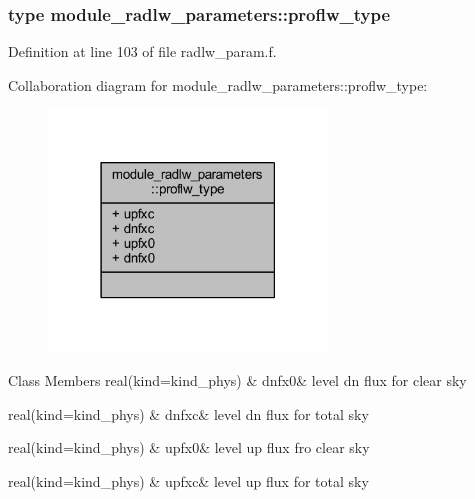 \subsubsection{type module\+\_\+radlw\+\_\+parameters\+:\+:proflw\+\_\+type}


Definition at line 103 of file radlw\+\_\+param.\+f.



Collaboration diagram for module\+\_\+radlw\+\_\+parameters\+:\+:proflw\+\_\+type\+:\nopagebreak
\begin{figure}[H]
\begin{center}
\leavevmode
\includegraphics[width=210pt]{structmodule__radlw__parameters_1_1proflw__type__coll__graph}
\end{center}
\end{figure}
\begin{DoxyFields}{Class Members}
real(kind=kind\+\_\+phys)\hypertarget{group__module__radlw__main_ga4804a215b761165846e87428b3f3c12c}{}\label{group__module__radlw__main_ga4804a215b761165846e87428b3f3c12c}
&
dnfx0&
level dn flux for clear sky \\
\hline

real(kind=kind\+\_\+phys)\hypertarget{group__module__radlw__main_ga5f7ae4abe7912e8dbe371b577ba91945}{}\label{group__module__radlw__main_ga5f7ae4abe7912e8dbe371b577ba91945}
&
dnfxc&
level dn flux for total sky \\
\hline

real(kind=kind\+\_\+phys)\hypertarget{group__module__radlw__main_ga90ec3938bb024acfd6f78d597890e78a}{}\label{group__module__radlw__main_ga90ec3938bb024acfd6f78d597890e78a}
&
upfx0&
level up flux fro clear sky \\
\hline

real(kind=kind\+\_\+phys)\hypertarget{group__module__radlw__main_gaefd4bfa2053b7e88173ac73ca219a9b2}{}\label{group__module__radlw__main_gaefd4bfa2053b7e88173ac73ca219a9b2}
&
upfxc&
level up flux for total sky \\
\hline

\end{DoxyFields}


